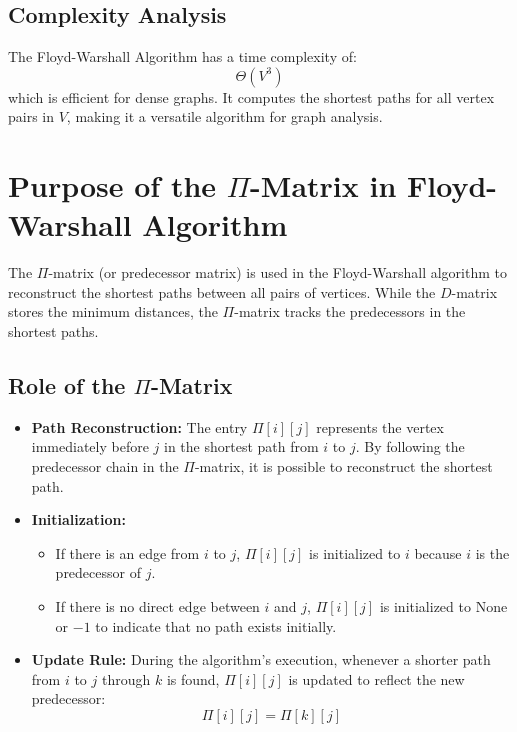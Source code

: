 \subsection{Complexity Analysis}
The Floyd-Warshall Algorithm has a time complexity of:
\[\Theta(V^3)\] which is efficient for dense graphs. It computes the shortest paths for all vertex pairs in \( V \), making it a versatile algorithm for graph analysis.

\section{Purpose of the \( \Pi \)-Matrix in Floyd-Warshall Algorithm}

The \( \Pi \)-matrix (or predecessor matrix) is used in the Floyd-Warshall algorithm to reconstruct the shortest paths between all pairs of vertices. While the \( D \)-matrix stores the minimum distances, the \( \Pi \)-matrix tracks the predecessors in the shortest paths.

\subsection{Role of the \( \Pi \)-Matrix}
\begin{itemize}
    \item \textbf{Path Reconstruction:}
    The entry \( \Pi[i][j] \) represents the vertex immediately before \( j \) in the shortest path from \( i \) to \( j \). By following the predecessor chain in the \( \Pi \)-matrix, it is possible to reconstruct the shortest path.

    \item \textbf{Initialization:}
    \begin{itemize}
        \item If there is an edge from \( i \) to \( j \), \( \Pi[i][j] \) is initialized to \( i \) because \( i \) is the predecessor of \( j \).
        \item If there is no direct edge between \( i \) and \( j \), \( \Pi[i][j] \) is initialized to \( \text{None} \) or \( -1 \) to indicate that no path exists initially.
    \end{itemize}

    \item \textbf{Update Rule:}
    During the algorithm's execution, whenever a shorter path from \( i \) to \( j \) through \( k \) is found, \( \Pi[i][j] \) is updated to reflect the new predecessor:
    \[
    \Pi[i][j] = \Pi[k][j]
    \]
\end{itemize}

